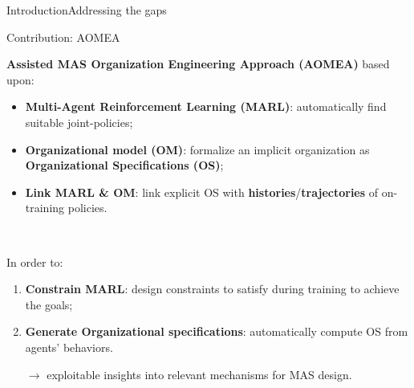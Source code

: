 \begin{frame}{Introduction}{Addressing the gaps}

    \begin{prosblock}{Contribution: AOMEA}

        \textbf{Assisted MAS Organization Engineering Approach (AOMEA)} based upon:
        \begin{itemize}
            \item \textbf{Multi-Agent Reinforcement Learning (MARL)}: automatically find suitable joint-policies;
            \item \textbf{Organizational model (OM)}: formalize an implicit organization as \textbf{Organizational Specifications (OS)};
            \item \textbf{Link MARL \& OM}: link explicit OS with \textbf{histories}/\textbf{trajectories} of on-training policies.
        \end{itemize}

        \

        In order to:
        \begin{enumerate}
            \item \textbf{Constrain MARL}: design constraints to satisfy during training to achieve the goals;
            \item \textbf{Generate Organizational specifications}: automatically compute OS from agents' behaviors.

                  $\rightarrow$ exploitable insights into relevant mechanisms for MAS design.
        \end{enumerate}

    \end{prosblock}


\end{frame}
